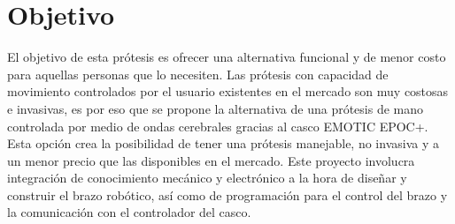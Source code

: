 \chapter{Objetivo}

El objetivo de esta prótesis es ofrecer una alternativa funcional y de menor costo para aquellas personas que lo necesiten. Las prótesis con capacidad de movimiento controlados por el usuario existentes en el mercado son muy costosas e invasivas, es por eso que se propone la alternativa de una prótesis de mano controlada por medio de ondas cerebrales gracias al casco EMOTIC EPOC+. Esta opción crea la posibilidad de tener una prótesis manejable, no invasiva y a un menor precio que las disponibles en el mercado.
Este proyecto involucra integración de conocimiento mecánico y electrónico a la hora de diseñar y construir el brazo robótico, así como de programación para el control del brazo y la comunicación con el controlador del casco.